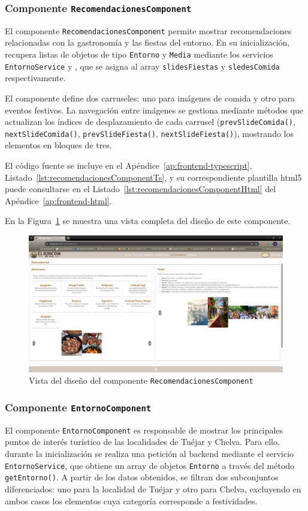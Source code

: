 \subsubsection{Componente \texttt{RecomendacionesComponent}}
El componente \texttt{RecomendacionesComponent} permite mostrar recomendaciones relacionadas con la gastronomía y las fiestas del entorno. En su inicialización, recupera listas de objetos de tipo \texttt{Entorno} y \texttt{Media} mediante los servicios \texttt{EntornoService} y , que se asigna al array \texttt{slidesFiestas} y \texttt{sledesComida} respectivamente.

El componente define dos carruseles: uno para imágenes de comida y otro para eventos festivos. La navegación entre imágenes se gestiona mediante métodos que actualizan los índices de desplazamiento de cada carrusel (\texttt{prevSlideComida()}, \texttt{nextSlideComida()}, \texttt{prevSlideFiesta()}, \texttt{nextSlideFiesta()}), mostrando los elementos en bloques de tres.

El código fuente se incluye en el Apéndice~\ref{ap:frontend-typescript}, Listado~\ref{lst:recomendacionesComponentTs}, y su correspondiente plantilla \gls{html5} puede consultarse en el Listado~\ref{lst:recomendacionesComponentHtml} del Apéndice~\ref{ap:frontend-html}.


En la Figura~\ref{fig:recomendaciones-component} se muestra una vista completa del diseño de este componente.
\begin{figure}

    \centering
        \includegraphics[width=1\textwidth]{figs/recomendaciones.png}
        \caption{Vista del diseño del componente \texttt{RecomendacionesComponent}}
        \label{fig:recomendaciones-component}
\end{figure}
\subsubsection{Componente \texttt{EntornoComponent}}
El componente \texttt{EntornoComponent} es responsable de mostrar los principales puntos de interés turístico de las localidades de Tuéjar y Chelva. Para ello, durante la inicialización se realiza una petición al backend mediante el servicio \texttt{EntornoService}, que obtiene un array de objetos \texttt{Entorno} a través del método \texttt{getEntorno()}. A partir de los datos obtenidos, se filtran dos subconjuntos diferenciados: uno para la localidad de Tuéjar y otro para Chelva, excluyendo en ambos casos los elementos cuya categoría corresponde a festividades.

